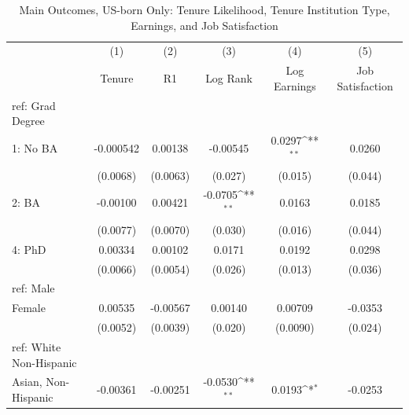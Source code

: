 \begin{table}[htbp]\centering
\def\sym#1{\ifmmode^{#1}\else\(^{#1}\)\fi}
\caption{Main Outcomes, US-born Only: Tenure Likelihood, Tenure Institution Type, Earnings, and Job Satisfaction \label{tab1}}
\begin{tabular}{l*{5}{c}}
\hline\hline
  &\multicolumn{1}{c}{(1)}&\multicolumn{1}{c}{(2)}&\multicolumn{1}{c}{(3)}&\multicolumn{1}{c}{(4)}&\multicolumn{1}{c}{(5)}\\
  &\multicolumn{1}{c}{Tenure}&\multicolumn{1}{c}{R1}&\multicolumn{1}{c}{Log Rank}&\multicolumn{1}{c}{Log Earnings}&\multicolumn{1}{c}{Job Satisfaction}\\
\hline
ref: Grad Degree&                     &                     &                     &                     &                     \\
[1em]
1: No BA&   -0.000542         &     0.00138         &    -0.00545         &      0.0297\sym{**} &      0.0260         \\
  &    (0.0068)         &    (0.0063)         &     (0.027)         &     (0.015)         &     (0.044)         \\
[1em]
2: BA&    -0.00100         &     0.00421         &     -0.0705\sym{**} &      0.0163         &      0.0185         \\
  &    (0.0077)         &    (0.0070)         &     (0.030)         &     (0.016)         &     (0.044)         \\
[1em]
4: PhD&     0.00334         &     0.00102         &      0.0171         &      0.0192         &      0.0298         \\
  &    (0.0066)         &    (0.0054)         &     (0.026)         &     (0.013)         &     (0.036)         \\
[1em]
ref: Male&                     &                     &                     &                     &                     \\
[1em]
Female&     0.00535         &    -0.00567         &     0.00140         &     0.00709         &     -0.0353         \\
  &    (0.0052)         &    (0.0039)         &     (0.020)         &    (0.0090)         &     (0.024)         \\
[1em]
ref: White Non-Hispanic&                     &                     &                     &                     &                     \\
[1em]
Asian, Non-Hispanic&    -0.00361         &    -0.00251         &     -0.0530\sym{**} &      0.0193\sym{*}  &     -0.0253         \\

\end{tabular}
\end{table}
